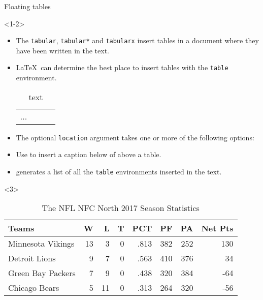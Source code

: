 \begin{frame}[fragile]{Floating tables}
	
	\begin{onlyenv}<1-2>
		\begin{itemize}
			\item The \texttt{tabular}, \texttt{tabular*} and \texttt{tabularx} insert tables in a document where they have been written in the text.
			\item \LaTeX\ can determine the best place to insert tables with the \texttt{table} environment.
\begin{codesource}
	\begin{table}[location]
		\begin{tabularx}{\textwidth}{lccc}
			...
		\end{tabularx}
		\caption{text}
	\end{table}
\end{codesource}

			\pause
			\item The optional \texttt{location} argument takes one or more of the following options:
			\item Use  to insert a caption below of above a table.
			\item {} generates a list of all the \texttt{table} environments inserted in the text.
		\end{itemize}
	\end{onlyenv}

	\begin{onlyenv}
		\begin{codesource}
\begin{table}
	\begin{tabularx}{\textwidth}{X|rrr|r|rrr}
		Teams				&	W	&	L	&	T	&	PCT		&	PF	&	PA	&	Net Pts \\
		\hline
		Minnesota Vikings	&	13	&	3	&	0	&	.813	&	382	&	252	&	130 \\
		Detroit Lions		&	9	&	7	&	0	&	.563	&	410	&	376	&	34 \\
		Green Bay Packers	&	7	&	9	& 	0	&	.438	&	320	&	384	&	-64 \\
		Chicago Bears		&	5	&	11	&	0	&	.313	&	264	&	320	&	-56
	\end{tabularx}
	\caption{The NFL NFC North 2017 Season Statistics}
\end{table}
		\end{codesource}
		

\end{onlyenv}
\end{frame}
